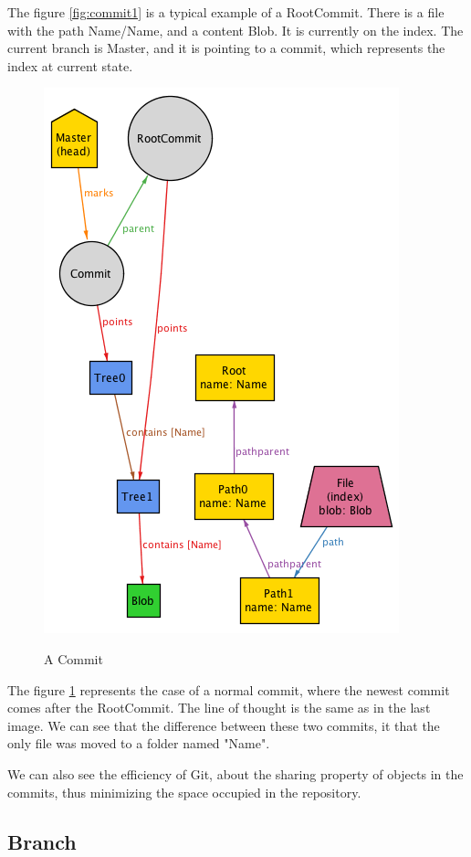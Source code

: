 The figure \ref{fig:commit1} is a typical example of a RootCommit. There is a file with the path
Name/Name, and a content Blob. It is currently on the index. The current branch
is Master, and it is pointing to a commit, which represents the index at current
state. \par

\begin{figure} 
	\caption{A Commit}
	\centering
	\includegraphics[scale=0.65]{images/commit2.png}
	\label{fig:commit2}
\end{figure}

The figure \ref{fig:commit2} represents the case of a normal commit, where the
newest commit comes after the RootCommit. The line of thought is the same as in
the last image. We can see that the difference between these two commits, it
that the only file was moved to a folder named "Name". \par
We can also see the efficiency of Git, about the sharing property of objects in
the commits, thus minimizing the space occupied in the repository. \par
\subsection{Branch}

